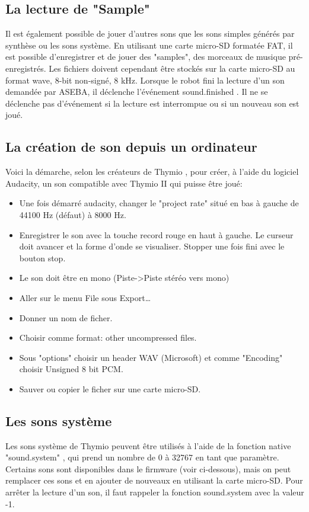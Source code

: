 \documentclass[a4paper, 12pt]{report}
\begin{document}
\subsection{La lecture de "Sample"}
Il est également possible de jouer d'autres sons que les sons simples générés par synthèse ou les sons système. En utilisant une carte micro-SD formatée FAT, il est possible d'enregistrer et de jouer des "samples", des morceaux de musique pré-enregistrés. Les fichiers doivent cependant être stockés sur la carte micro-SD au format wave, 8-bit non-signé, 8 kHz. Lorsque le robot fini la lecture d'un son demandée par ASEBA, il déclenche l'événement sound.finished . Il ne se déclenche pas d'événement si la lecture est interrompue ou si un nouveau son est joué.\\

\subsection{La création de son depuis un ordinateur}
Voici la démarche, selon les créateurs de Thymio \pageref{thymio}, pour créer, à l'aide du logiciel Audacity, un son compatible avec Thymio II qui puisse être joué:\\
\begin{itemize}
\item Une fois démarré audacity, changer le "project rate" situé en bas à gauche de 44100 Hz (défaut) à 8000 Hz.
\item Enregistrer le son avec la touche record rouge en haut à gauche. Le curseur doit avancer et la forme d'onde se visualiser. Stopper une fois fini avec le bouton stop.
\item Le son doit être en mono (Piste->Piste stéréo vers mono)
\item Aller sur le menu File sous Export…
\item Donner un nom de ficher.
\item Choisir comme format: other uncompressed files.
\item Sous "options" choisir un header WAV (Microsoft) et comme "Encoding" choisir Unsigned 8 bit PCM.
\item Sauver ou copier le ficher sur une carte micro-SD.
\end{itemize}

\subsection{Les sons système}
Les sons système de Thymio \pageref{thymio} peuvent être utilisés à l'aide de la fonction native "sound.system" , qui prend un nombre de 0 à 32767 en tant que paramètre. Certains sons sont disponibles dans le firmware (voir ci-dessous), mais on peut remplacer ces sons et en ajouter de nouveaux en utilisant la carte micro-SD. Pour arrêter la lecture d'un son, il faut rappeler la fonction sound.system avec la valeur -1.
\end{document}
